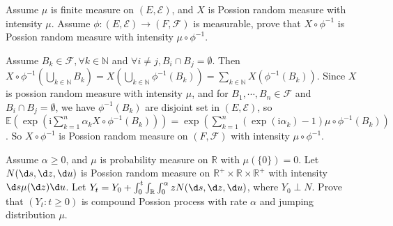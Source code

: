 \documentclass{ctexart}
\begin{document}
\begin{problem}\label{pro:3}
  Assume \(\mu\) is finite measure on \((E,\mathcal{E})\), and \(X\) is Possion random measure with intensity \(\mu\).
  Assume \(\phi:(E,\mathcal{E}) \to (F,\mathcal{F})\) is measurable, prove that
  \(X \circ \phi^{-1}\) is Possion random measure with intensity \(\mu \circ \phi^{-1}\).
\end{problem}
\begin{solution}
  Assume \(B_k \in \mathcal{F},\forall k \in \mathbb{N}\) and \(\forall i \neq j,B_i \cap B_j = \emptyset\).
  Then \(X \circ \phi^{-1} (\bigcup_{k \in \mathbb{N}}B_k)=X(\bigcup_{k \in \mathbb{N}}\phi^{-1}(B_k))=\sum_{k \in \mathbb{N}}X(\phi^{-1}(B_k))\).
  Since \(X\) is possion random measure with intensity \(\mu\), and for \(B_1,\cdots,B_n \in \mathcal{F}\) and \(B_i \cap B_j=\emptyset\), we have \(\phi^{-1}(B_k)\) are disjoint set in \((E,\mathcal{E})\), so
  \(\mathbb{E}(\exp(\mathrm{i}\sum_{k=1}^{n} \alpha_k X \circ \phi^{-1}(B_k)))=\exp(\sum_{k=1}^{n} (\exp(\mathrm{i}\alpha_k)-1)\mu \circ \phi^{-1}(B_k))\).
  So \(X \circ \phi^{-1}\) is Possion random measure on \((F,\mathcal{F})\) with intensity \(\mu \circ \phi^{-1}\).
\end{solution}
\begin{problem}\label{pro:4}
  Assume \(\alpha \geq 0\), and \(\mu\) is probability measure on \(\mathbb{R}\) with \(\mu(\{0\})=0\).
  Let \(N(\d s,\d z,\d u)\) is Possion random measure on \(\mathbb{R}^+ \times \mathbb{R} \times \mathbb{R}^+\) with intensity \(\d s \mu (\d z) \d u\).
  Let \(Y_t=Y_0+\int_{0}^{t} \int_{\mathbb{R}}\int_{0}^\alpha z N(\d s,\d z, \d u)\), where \(Y_0 \perp N\).
  Prove that \((Y_t:t \geq 0)\) is compound Possion process with rate \(\alpha\) and jumping distribution \(\mu\).
\end{problem}
\end{document}
